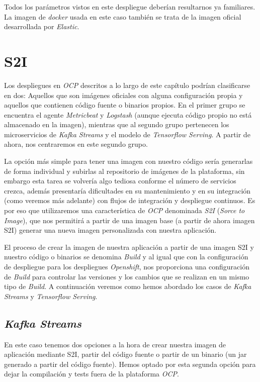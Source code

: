 Todos los parámetros vistos en este despliegue deberían resultarnos ya familiares. La imagen de \textit{docker} usada en este caso también se trata de la imagen oficial desarrollada por \textit{Elastic}.


\section{S2I}
Los despliegues en \textit{OCP} descritos a lo largo de este capítulo podrían clasificarse en dos: Aquellos que son imágenes oficiales con alguna configuración propia y aquellos que contienen código fuente o binarios propios. En el primer grupo se encuentra el agente \textit{Metricbeat} y \textit{Logstash} (aunque ejecuta código propio no está almacenado en la imagen), mientras que al segundo grupo pertenecen los microservicios de \textit{Kafka Streams} y el modelo de \textit{Tensorflow Serving}. A partir de ahora, nos centraremos en este segundo grupo.

La opción más simple para tener una imagen con nuestro código sería generarlas de forma individual y subirlas al repositorio de imágenes de la plataforma, sin embargo esta tarea se volvería algo tediosa conforme el número de servicios crezca, además presentaría dificultades en su mantenimiento y en su integración (como veremos más adelante) con flujos de integración y despliegue continuos. Es por eso que utilizaremos una característica de \textit{OCP} denominada \textit{S2I} (\textit{Sorce to Image}), que nos permitirá a partir de una imagen base (a partir de ahora imagen S2I) generar una nueva imagen personalizada con nuestra aplicación. 

El proceso de crear la imagen de nuestra aplicación a partir de una imagen S2I y nuestro código o binarios se denomina \textit{Build} y al igual que con la configuración de despliegue para los despliegues \textit{Openshift}, nos proporciona una configuración de \textit{Build} para controlar las versiones y los cambios que se realizan en un mismo tipo de \textit{Build}. A continuación veremos como hemos abordado los casos de \textit{Kafka Streams} y \textit{Tensorflow Serving}.


\subsection{\textit{Kafka Streams}}

En este caso tenemos dos opciones a la hora de crear nuestra imagen de aplicación mediante S2I, partir del código fuente o partir de un binario (un jar generado a partir del código fuente). Hemos optado por esta segunda opción para dejar la compilación y tests fuera de la plataforma \textit{OCP}. 

